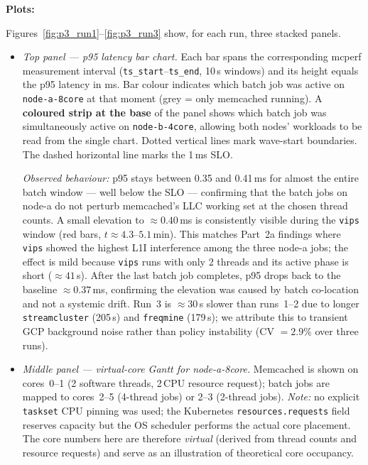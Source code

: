 \noindent\textbf{Plots:}

Figures~\ref{fig:p3_run1}--\ref{fig:p3_run3} show, for each run, three
stacked panels.

\begin{itemize}
  \item \emph{Top panel — p95 latency bar chart.}
    Each bar spans the corresponding mcperf measurement interval
    (\texttt{ts\_start}–\texttt{ts\_end}, 10\,s windows) and its height
    equals the p95 latency in ms.
    Bar colour indicates which batch job was active on \texttt{node-a-8core}
    at that moment (grey = only memcached running).
    A \textbf{coloured strip at the base} of the panel shows which batch job
    was simultaneously active on \texttt{node-b-4core}, allowing both nodes'
    workloads to be read from the single chart.
    Dotted vertical lines mark wave-start boundaries.
    The dashed horizontal line marks the 1\,ms SLO.

    \emph{Observed behaviour:} p95 stays between 0.35 and 0.41\,ms for
    almost the entire batch window — well below the SLO — confirming that
    the batch jobs on node-a do not perturb memcached's LLC working set at
    the chosen thread counts.
    A small elevation to $\approx 0.40$\,ms is consistently visible during
    the \texttt{vips} window (red bars, $t \approx 4.3$–$5.1$\,min).
    This matches Part~2a findings where \texttt{vips} showed the highest
    L1I interference among the three node-a jobs; the effect is mild because
    \texttt{vips} runs with only 2 threads and its active phase is short
    (${\approx}41$\,s).
    After the last batch job completes, p95 drops back to the baseline
    ${\approx}0.37$\,ms, confirming the elevation was caused by batch
    co-location and not a systemic drift.
    Run~3 is ${\approx}30$\,s slower than runs~1--2 due to longer
    \texttt{streamcluster} (205\,s) and \texttt{freqmine} (179\,s); we
    attribute this to transient GCP background noise rather than policy
    instability (CV $= 2.9\%$ over three runs).

  \item \emph{Middle panel — virtual-core Gantt for node-a-8core.}
    Memcached is shown on cores~0–1 (2 software threads, 2\,CPU resource
    request); batch jobs are mapped to cores~2–5 (4-thread jobs) or 2–3
    (2-thread jobs).
    \emph{Note:} no explicit \texttt{taskset} CPU pinning was used; the
    Kubernetes \texttt{resources.requests} field reserves capacity but the
    OS scheduler performs the actual core placement.  The core numbers here
    are therefore \emph{virtual} (derived from thread counts and resource
    requests) and serve as an illustration of theoretical core occupancy.


\end{itemize}

